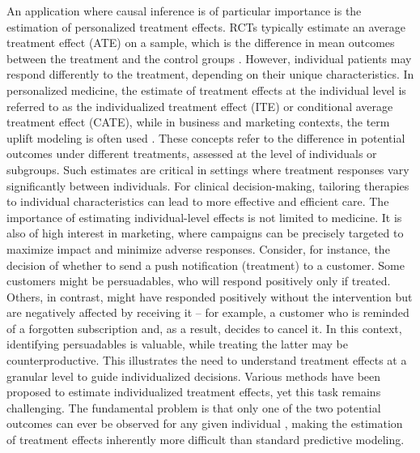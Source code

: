 An application where causal inference is of particular importance is the estimation of personalized treatment effects. RCTs typically estimate an average treatment effect (ATE) on a sample, which is the difference in mean outcomes between the treatment and the control groups \citep{nichols2007}. However, individual patients may respond differently to the treatment, depending on their unique characteristics. 
In personalized medicine, the estimate of treatment effects at the individual level is referred to as the individualized treatment effect (ITE) or conditional average treatment effect (CATE), while in business and marketing contexts, the term uplift modeling is often used \citep{gutierrez2017, zhao2020}. These concepts refer to the difference in potential outcomes under different treatments, assessed at the level of individuals or subgroups. Such estimates are critical in settings where treatment responses vary significantly between individuals. For clinical decision-making, tailoring therapies to individual characteristics can lead to more effective and efficient care. The importance of estimating individual-level effects is not limited to medicine. It is also of high interest in marketing, where campaigns can be precisely targeted to maximize impact and minimize adverse responses. Consider, for instance, the decision of whether to send a push notification (treatment) to a customer. Some customers might be persuadables, who will respond positively only if treated. Others, in contrast, might have responded positively without the intervention but are negatively affected by receiving it -- for example, a customer who is reminded of a forgotten subscription and, as a result, decides to cancel it. In this context, identifying persuadables is valuable, while treating the latter may be counterproductive. This illustrates the need to understand treatment effects at a granular level to guide individualized decisions.
Various methods have been proposed to estimate individualized treatment effects, yet this task remains challenging. The fundamental problem is that only one of the two potential outcomes can ever be observed for any given individual \citep{holland1986}, making the estimation of treatment effects inherently more difficult than standard predictive modeling.









